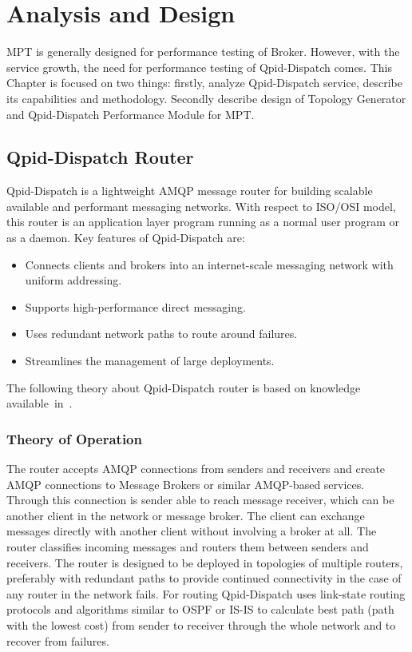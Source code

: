 
\chapter{Analysis and Design}
\label{Analysis and Design}
MPT is generally designed for performance testing of Broker. However, with the service growth, the need for performance testing of Qpid-Dispatch comes. This Chapter is focused on two things: firstly, analyze Qpid-Dispatch service, describe its capabilities and methodology. Secondly describe design of Topology Generator and Qpid-Dispatch Performance Module for MPT.

\section{Qpid-Dispatch Router}
Qpid-Dispatch is a lightweight AMQP message router for building scalable available and performant messaging networks. With respect to ISO/OSI\footnotemark{} model, this router is an application layer program running as a normal user program or as a daemon. Key features of Qpid-Dispatch are:

\begin{itemize}
	\setlength\itemsep{0em}
	\item Connects clients and brokers into an internet-scale messaging network with uniform addressing.
	\item Supports high-performance direct messaging.
	\item Uses redundant network paths to route around failures.
	\item Streamlines the management of large deployments.
\end{itemize}
The following theory about Qpid-Dispatch router is based on knowledge available~in~\cite{RH:Interconnect}.


\subsection{Theory of Operation}
The router accepts AMQP connections from senders and receivers and create AMQP connections to Message Brokers or similar AMQP-based services. Through this connection is sender able to reach message receiver, which can be another client in the network or message broker. The client can exchange messages directly with another client without involving a broker at all. The router classifies incoming messages and routers them between senders and receivers. The router is designed to be deployed in topologies of multiple routers, preferably with redundant paths to provide continued connectivity in the case of any router in the network fails. For routing Qpid-Dispatch uses link-state routing protocols\footnotemark{} and algorithms similar to OSPF or IS-IS to calculate best path (path with the lowest cost) from sender to receiver through the whole network and to recover from failures.

